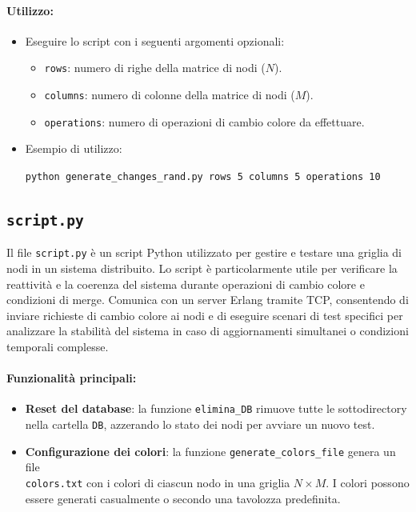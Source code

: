 \documentclass[12pt, a4paper]{report}
\begin{document}
\paragraph{Utilizzo:}
\begin{itemize}
    \item Eseguire lo script con i seguenti argomenti opzionali:
        \begin{itemize}
            \item \texttt{rows}: numero di righe della matrice di nodi ($N$).
            \item \texttt{columns}: numero di colonne della matrice di nodi ($M$).
            \item \texttt{operations}: numero di operazioni di cambio colore da effettuare.
        \end{itemize}
    \item Esempio di utilizzo:
      
      \hspace{20pt}\texttt{python generate\_changes\_rand.py \-\-rows 5 \-\-columns 5 \-\-operations 10}
\end{itemize}

\subsection{\texttt{script.py}}\label{sec:script}

Il file \texttt{script.py} è un script Python utilizzato per gestire e testare una griglia di nodi in un sistema distribuito. Lo script è particolarmente utile per verificare la reattività e la coerenza del sistema durante operazioni di cambio colore e condizioni di merge. Comunica con un server Erlang tramite TCP, consentendo di inviare richieste di cambio colore ai nodi e di eseguire scenari di test specifici per analizzare la stabilità del sistema in caso di aggiornamenti simultanei o condizioni temporali complesse.

\paragraph{Funzionalit\`a principali:}
\begin{itemize}
    \item \textbf{Reset del database}: la funzione \texttt{elimina\_DB} rimuove tutte le sottodirectory nella cartella \texttt{DB}, azzerando lo stato dei nodi per avviare un nuovo test.
    \item \textbf{Configurazione dei colori}: la funzione \texttt{generate\_colors\_file} genera un file \\
    \texttt{colors.txt} con i colori di ciascun nodo in una griglia $N \times M$. I colori possono essere generati casualmente o secondo una tavolozza predefinita.
\end{itemize}
\end{document}
